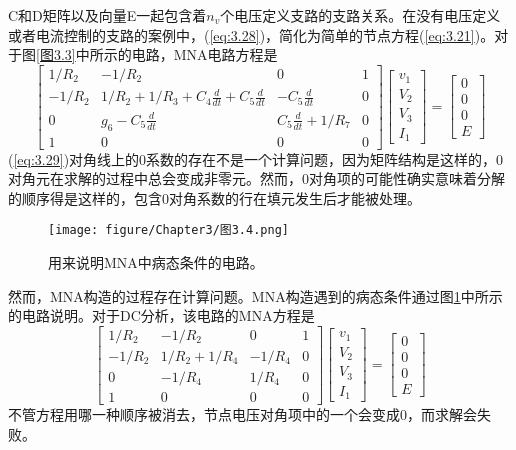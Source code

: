 C和D矩阵以及向量E一起包含着$n_v$个电压定义支路的支路关系。在没有电压定义或者电流控制的支路的案例中，(\ref{eq:3.28})，简化为简单的节点方程(\ref{eq:3.21})。对于图\ref{图3.3}中所示的电路，MNA电路方程是
\begin{equation}
    \begin{bmatrix}
    1/R_2 & -1/R_2 & 0 & 1 \\
    -1/R_2 & 1/R_2 + 1/R_3 + C_4\frac{d}{dt} + C_5\frac{d}{dt} & -C_5 \frac{d}{dt} & 0 \\
    0 & g_6 - C_5\frac{d}{dt} & C_5\frac{d}{dt} + 1/R_7 & 0 \\
    1 & 0 & 0 & 0
    \end{bmatrix}\begin{bmatrix}
    v_1 \\
    V_2 \\
    V_3 \\
    I_1
    \end{bmatrix} = \begin{bmatrix}
    0 \\
    0 \\
    0 \\
    E
    \end{bmatrix}
    \label{eq:3.29}
\end{equation}
(\ref{eq:3.29})对角线上的0系数的存在不是一个计算问题，因为矩阵结构是这样的，0对角元在求解的过程中总会变成非零元。然而，0对角项的可能性确实意味着分解的顺序得是这样的，包含0对角系数的行在填元发生后才能被处理。

\begin{figure}[htbp]
\small
    \centering
    \texttt{[image: figure/Chapter3/图3.4.png]}
    \caption{用来说明MNA中病态条件的电路。}
    \label{图3.4}
\end{figure}

然而，MNA构造的过程存在计算问题。MNA构造遇到的病态条件通过图\ref{图3.4}中所示的电路说明。对于DC分析，该电路的MNA方程是
\begin{equation}
    \begin{bmatrix}
    1/R_2 & -1/R_2 & 0 & 1 \\
    -1/R_2 & 1/R_2 + 1/R_4  & -1/R_4 & 0 \\
    0 & -1/R_4 & 1/R_4 & 0 \\
    1 & 0 & 0 & 0
    \end{bmatrix}\begin{bmatrix}
    v_1 \\
    V_2 \\
    V_3 \\
    I_1
    \end{bmatrix} = \begin{bmatrix}
    0 \\
    0 \\
    0 \\
    E
    \end{bmatrix}
    \label{eq:3.30}
\end{equation}
不管方程用哪一种顺序被消去，节点电压对角项中的一个会变成0，而求解会失败。


